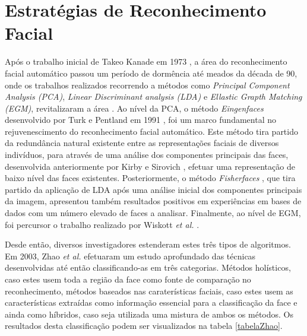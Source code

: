 \section{Estratégias de Reconhecimento Facial}\label{sec:estratégias}
Após o trabalho inicial de Takeo Kanade em 1973 \citep{Kanade1973}, a área do reconhecimento facial automático passou um período de dormência até meados da década de 90, onde os trabalhos realizados recorrendo a métodos como \textit{Principal Component Analysis (PCA)}, \textit{Linear Discriminant analysis (LDA)} e \textit{Ellastic Grapth Matching (EGM)}, revitalizaram a área \citep{Chellappa2010}. Ao nível da PCA, o método
 \textit{Eingenfaces} desenvolvido por Turk e Pentland em 1991 \cite{Turk1991}, foi um marco fundamental no rejuvenescimento do reconhecimento facial automático. Este método tira partido da redundância natural existente entre as representações faciais de diversos indivíduos, para através de uma análise dos componentes principais das faces, desenvolvida anteriormente por Kirby e Sirovich  \cite{Kirby1990}, efetuar uma representação de baixo nível das faces existentes. Posteriormente, o método \textit{Fisherfaces} \cite{Belhumeur1997, Etemad1997, Zhao1998}, que tira partido da aplicação de LDA após uma análise inicial dos componentes principais da imagem, apresentou também resultados positivos em experiências em bases de dados com um número elevado de faces a analisar. Finalmente, ao nível de EGM, foi percursor o trabalho realizado por Wiskott \textit{et al.} \citep{Wiskott1997}. 
 
Desde então, diversos investigadores estenderam estes três tipos de algoritmos. Em 2003, Zhao \textit{et al.} \citep{Zhao2003} efetuaram um estudo aprofundado das técnicas desenvolvidas até então classificando-as em três categorias. Métodos holísticos, caso estes usem toda a região da face como fonte de comparação no reconhecimento, métodos baseados nas caraterísticas faciais, caso estes usem as características extraídas como informação essencial para a classificação da face e ainda como híbridos, caso seja utilizada uma mistura de ambos os métodos. Os resultados desta classificação podem ser visualizados na tabela \ref{tabelaZhao}.

